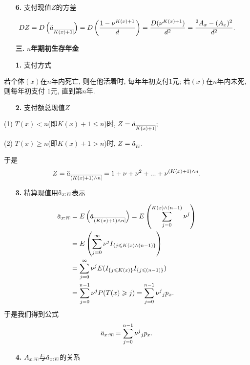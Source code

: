\documentclass[a4paper,openany, 10pt]{ctexbook}
\makeatletter
\newcommand{\hei}{\CJKfamily{hei}}      %
\def\z{\left}
\def\y{\right}
\DeclareRobustCommand{\annu}[1]{_{%
    \def\arraystretch{0}%
    \setlength\arraycolsep{1pt}%
    \setlength\arrayrulewidth{.2pt}%
    \begin{array}[b]{@{}c|}\hline
        \\[\arraycolsep]%
        \scriptstyle #1%
    \end{array}%
}}
\makeatother
\begin{document}
\begin{itemize}
    \item[{\bf\hei 6.}]支付现值$Z$的方差
\end{itemize}
\begin{align*}
    DZ=D\z(\ddot a_{\annu {K(x)+1}}\y)=D\z(\frac{1-\nu^{K(x)+1}}{d}\y)=\frac{D(\nu^{K(x)+1})}{d^2}=\frac{{}^2A_x-(A_x)^2}{d^2}.
\end{align*}

\begin{itemize}
    \item[{\bf\hei 三.}]{\bf\hei $n$年期初生存年金}
\end{itemize}

\begin{itemize}
    \item[{\bf\hei 1.}]支付方式
\end{itemize}

若个体$(x)$在$n$年内死亡, 则在他活着时, 每年年初支付$1$元; 若$(x)$在$n$年内未死, 则每年初支付
$1$元, 直到第$n$年.

\begin{itemize}
    \item[{\bf\hei 2.}]支付额总现值$Z$
\end{itemize}

(1) $T(x)<n$(即$K(x)+1\leqslant n$)时, $Z=\ddot a_{\annu {K(x)+1}};$

(2) $T(x)\geqslant n$(即$K(x)+1>n$)时, $Z=\ddot a_{\annu {n}}.$

于是$$Z=\ddot a_{\annu {(K(x)+1)\land n}}=1+\nu+\nu^2+...+\nu^{(K(x)+1)\land n}.$$
\begin{itemize}
    \item[{\bf\hei 3.}]精算现值用$\ddot a_{x:}{}{\annu n}$表示
\end{itemize}
\begin{align*}
    \ddot a_{x:}{}{\annu n} & = E\z(\ddot a_{\annu {(K(x)+1)\land n}}\y)=E\z(\sum_{j=0}^{K(x)\land (n-1)}{\nu^j}\y) \\
                             & =E\z(\sum_{j=0}^{\infty}{\nu^j}I_{\{j\leqslant K(x)\land(n-1)\}}\y)               \\
                             & =\sum_{j=0}^{\infty}{\nu^j}E(I_{\{j\leqslant K(x)\}}I_{\{j\leqslant (n-1)\}}) \\
                             & =\sum_{j=0}^{n-1}{\nu^j}P(T(x)\geqslant j)=\sum_{j=0}^{n-1}{\nu^j}{}_j p_x .
\end{align*}
于是我们得到公式
$$\ddot a_{x:}{}{\annu n}=\sum_{j=0}^{n-1}{\nu^j}{}_j p_x .$$
\begin{itemize}
    \item[{\bf\hei 4.}]$A_{x:}{}{\annu n}$与$\ddot a_{x:}{}{\annu n}$的关系
\end{itemize}
\end{document}
